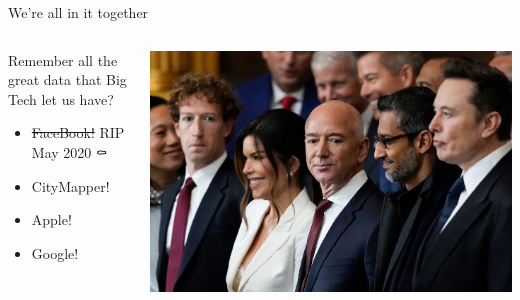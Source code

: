 \documentclass[
  ignorenonframetext,
]{beamer}
\providecommand{\tightlist}{%
  \setlength{\itemsep}{0pt}\setlength{\parskip}{0pt}}\usepackage{longtable,booktabs,array}
\begin{document}
\begin{frame}{We're all in it together}
\label{were-all-in-it-together-1}
\begin{columns}[T]
\begin{column}{0.4\textwidth}
Remember all the great data that Big Tech let us have?

\begin{itemize}
\tightlist
\item
  \st{FaceBook!} RIP May 2020 ⚰️
\item
  CityMapper!
\item
  Apple!
\item
  Google!
\end{itemize}
\end{column}

\begin{column}{0.6\textwidth}
\includegraphics{images/tech_knobs.jpeg}
\end{column}
\end{columns}
\end{frame}
\end{document}
